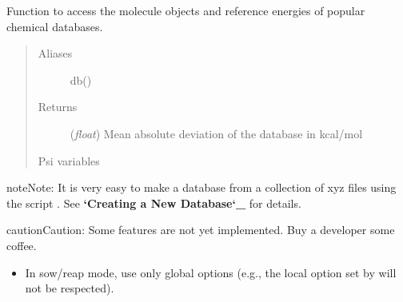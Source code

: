 \documentclass[letterpaper,10pt,english]{sphinxmanual}
\begin{document}
\begin{fulllineitems}
\label{index:wrappers.database}
Function to access the molecule objects and reference energies of
popular chemical databases.
\begin{quote}\begin{description}
\item[{Aliases }] \leavevmode
db()

\item[{Returns}] \leavevmode
(\emph{float}) Mean absolute deviation of the database in kcal/mol

\item[{Psi variables}] \leavevmode
\end{description}\end{quote}

\begin{fulllineitems}
\label{index:envvar-db_nameDATABASEMEANSIGNEDDEVIATION}\label{index:envvar-db_nameDATABASEMEANABSOLUTEDEVIATION}\label{index:envvar-db_nameDATABASEROOT-MEAN-SQUAREDEVIATION}
\end{fulllineitems}


\begin{notice}{note}{Note:}
It is very easy to make a database from a collection of xyz files
using the script .
See {\color{red}\bfseries{}{}`Creating a New Database{}`\_} for details.
\end{notice}

\begin{notice}{caution}{Caution:}
Some features are not yet implemented. Buy a developer some coffee.
\begin{itemize}
\item {} 
In sow/reap mode, use only global options (e.g., the local option set by  will not be respected).


\end{itemize}
\end{notice}
\end{fulllineitems}
\end{document}
